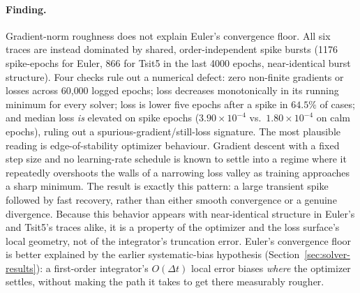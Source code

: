 \paragraph{Finding.} Gradient-norm roughness does not explain Euler's
convergence floor. All six traces are instead dominated by shared,
order-independent spike bursts (1176 spike-epochs for Euler, 866 for Tsit5 in
the last 4000 epochs, near-identical burst structure). Four checks rule out a
numerical defect: zero non-finite gradients or losses across 60{,}000 logged
epochs; loss decreases monotonically in its running minimum for every solver;
loss is lower five epochs after a spike in $64.5\%$ of cases; and median loss
\emph{is} elevated on spike epochs ($3.90\times10^{-4}$ vs.\ $1.80\times10^{-4}$
on calm epochs), ruling out a spurious-gradient/still-loss signature. The
most plausible reading is edge-of-stability optimizer behaviour. Gradient
descent with a fixed step size and no learning-rate schedule is known to
settle into a regime where it repeatedly overshoots the walls of a narrowing
loss valley as training approaches a sharp minimum. The result is exactly
this pattern: a large transient spike followed by fast recovery, rather than
either smooth convergence or a genuine divergence. Because this behavior
appears with near-identical structure in Euler's and Tsit5's traces alike,
it is a property of the optimizer and the loss surface's local geometry, not
of the integrator's truncation error. Euler's convergence floor is better
explained by the earlier systematic-bias hypothesis
(Section~\ref{sec:solver-results}): a first-order integrator's $O(\Delta t)$
local error biases \emph{where} the optimizer settles, without making the
path it takes to get there measurably rougher.
